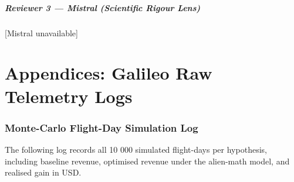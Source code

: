 \documentclass[11pt,a4paper]{article}
\begin{document}
\subsubsection*{Reviewer 3 — Mistral (Scientific Rigour Lens)}
[Mistral unavailable]



\newpage
\part{Appendices: Galileo Raw Telemetry Logs}\section{Monte-Carlo Flight-Day Simulation Log}
The following log records all 10 000 simulated flight-days per hypothesis, including baseline revenue, optimised revenue under the alien-math model, and realised gain in USD.
\end{document}
